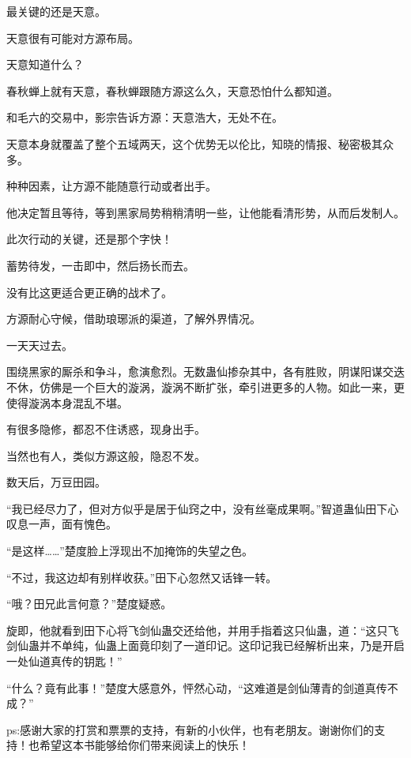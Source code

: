 \begin{this_body}
最关键的还是天意。

天意很有可能对方源布局。

天意知道什么？

春秋蝉上就有天意，春秋蝉跟随方源这么久，天意恐怕什么都知道。

和毛六的交易中，影宗告诉方源：天意浩大，无处不在。

天意本身就覆盖了整个五域两天，这个优势无以伦比，知晓的情报、秘密极其众多。

种种因素，让方源不能随意行动或者出手。

他决定暂且等待，等到黑家局势稍稍清明一些，让他能看清形势，从而后发制人。

此次行动的关键，还是那个字快！

蓄势待发，一击即中，然后扬长而去。

没有比这更适合更正确的战术了。

方源耐心守候，借助琅琊派的渠道，了解外界情况。

一天天过去。

围绕黑家的厮杀和争斗，愈演愈烈。无数蛊仙掺杂其中，各有胜败，阴谋阳谋交迭不休，仿佛是一个巨大的漩涡，漩涡不断扩张，牵引进更多的人物。如此一来，更使得漩涡本身混乱不堪。

有很多隐修，都忍不住诱惑，现身出手。

当然也有人，类似方源这般，隐忍不发。

数天后，万豆田园。

“我已经尽力了，但对方似乎是居于仙窍之中，没有丝毫成果啊。”智道蛊仙田下心叹息一声，面有愧色。

“是这样……”楚度脸上浮现出不加掩饰的失望之色。

“不过，我这边却有别样收获。”田下心忽然又话锋一转。

“哦？田兄此言何意？”楚度疑惑。

旋即，他就看到田下心将飞剑仙蛊交还给他，并用手指着这只仙蛊，道：“这只飞剑仙蛊并不单纯，仙蛊上面竟印刻了一道印记。这印记我已经解析出来，乃是开启一处仙道真传的钥匙！”

“什么？竟有此事！”楚度大感意外，怦然心动，“这难道是剑仙薄青的剑道真传不成？”

ps:感谢大家的打赏和票票的支持，有新的小伙伴，也有老朋友。谢谢你们的支持！也希望这本书能够给你们带来阅读上的快乐！

\end{this_body}

